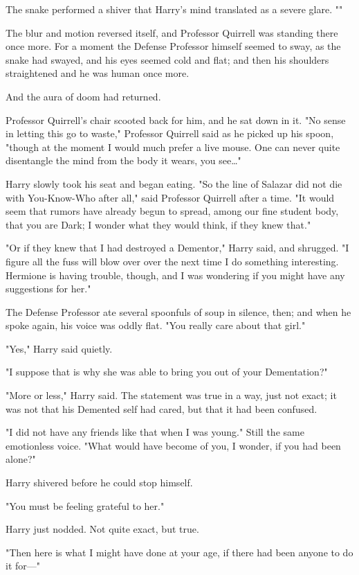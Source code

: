 The snake performed a shiver that Harry's mind translated as a severe glare.
""

The blur and motion reversed itself, and Professor Quirrell was standing there
once more. For a moment the Defense Professor himself seemed to sway, as the
snake had swayed, and his eyes seemed cold and flat; and then his shoulders
straightened and he was human once more.

And the aura of doom had returned.

Professor Quirrell's chair scooted back for him, and he sat down in it. "No
sense in letting this go to waste," Professor Quirrell said as he picked up his
spoon, "though at the moment I would much prefer a live mouse. One can never
quite disentangle the mind from the body it wears, you see{\ldots}"

Harry slowly took his seat and began eating.
\later
"So the line of Salazar did not die with You-Know-Who after all," said
Professor Quirrell after a time. "It would seem that rumors have already begun
to spread, among our fine student body, that you are Dark; I wonder what they
would think, if they knew that."

"Or if they knew that I had destroyed a Dementor," Harry said, and shrugged. "I
figure all the fuss will blow over over the next time I do something
interesting. Hermione is having trouble, though, and I was wondering if you
might have any suggestions for her."

The Defense Professor ate several spoonfuls of soup in silence, then; and when
he spoke again, his voice was oddly flat. "You really care about that girl."

"Yes," Harry said quietly.

"I suppose that is why she was able to bring you out of your Dementation?"

"More or less," Harry said. The statement was true in a way, just not exact; it
was not that his Demented self had cared, but that it had been confused.

"I did not have any friends like that when I was young." Still the same
emotionless voice. "What would have become of you, I wonder, if you had been
alone?"

Harry shivered before he could stop himself.

"You must be feeling grateful to her."

Harry just nodded. Not quite exact, but true.

"Then here is what I might have done at your age, if there had been anyone to
do it for---"
